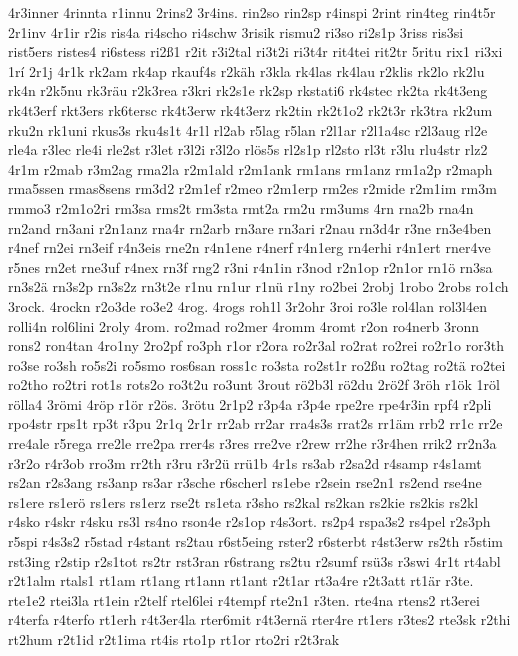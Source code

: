 {4r3inner
4rinnta
r1innu
2rins2
3r4ins.
rin2so
rin2sp
r4inspi
2rint
rin4teg
rin4t5r
2r1inv
4r1ir
r2is
ris4a
ri4scho
ri4schw
3risik
rismu2
ri3so
ri2s1p
3riss
ris3si
rist5ers
ristes4
ri6stess
ri2ß1
r2it
r3i2tal
ri3t2i
ri3t4r
rit4tei
rit2tr
5ritu
rix1
ri3xi
1rí
2r1j
4r1k
rk2am
rk4ap
rkauf4s
r2käh
r3kla
rk4las
rk4lau
r2klis
rk2lo
rk2lu
rk4n
r2k5nu
rk3räu
r2k3rea
r3kri
rk2s1e
rk2sp
rkstati6
rk4stec
rk2ta
rk4t3eng
rk4t3erf
rkt3ers
rk6tersc
rk4t3erw
rk4t3erz
rk2tin
rk2t1o2
rk2t3r
rk3tra
rk2um
rku2n
rk1uni
rkus3s
rku4s1t
4r1l
rl2ab
r5lag
r5lan
r2l1ar
r2l1a4sc
r2l3aug
rl2e
rle4a
r3lec
rle4i
rle2st
r3let
r3l2i
r3l2o
rlös5s
rl2s1p
rl2sto
rl3t
r3lu
rlu4str
rlz2
4r1m
r2mab
r3m2ag
rma2la
r2m1ald
r2m1ank
rm1ans
rm1anz
rm1a2p
r2maph
rma5ssen
rmas8sens
rm3d2
r2m1ef
r2meo
r2m1erp
rm2es
r2mide
r2m1im
rm3m
rmmo3
r2m1o2ri
rm3sa
rms2t
rm3sta
rmt2a
rm2u
rm3ums
4rn
rna2b
rna4n
rn2and
rn3ani
r2n1anz
rna4r
rn2arb
rn3are
rn3ari
r2nau
rn3d4r
r3ne
rn3e4ben
r4nef
rn2ei
rn3eif
r4n3eis
rne2n
r4n1ene
r4nerf
r4n1erg
rn4erhi
r4n1ert
rner4ve
r5nes
rn2et
rne3uf
r4nex
rn3f
rng2
r3ni
r4n1in
r3nod
r2n1op
r2n1or
rn1ö
rn3sa
rn3s2ä
rn3s2p
rn3s2z
rn3t2e
r1nu
rn1ur
r1nü
r1ny
ro2bei
2robj
1robo
2robs
ro1ch
3rock.
4rockn
r2o3de
ro3e2
4rog.
4rogs
roh1l
3r2ohr
3roi
ro3le
rol4lan
rol3l4en
rolli4n
rol6lini
2roly
4rom.
ro2mad
ro2mer
4romm
4romt
r2on
ro4nerb
3ronn
rons2
ron4tan
4ro1ny
2ro2pf
ro3ph
r1or
r2ora
ro2r3al
ro2rat
ro2rei
ro2r1o
ror3th
ro3se
ro3sh
ro5s2i
ro5smo
ros6san
ross1c
ro3sta
ro2st1r
ro2ßu
ro2tag
ro2tä
ro2tei
ro2tho
ro2tri
rot1s
rots2o
ro3t2u
ro3unt
3rout
rö2b3l
rö2du
2rö2f
3röh
r1ök
1röl
rölla4
3römi
4röp
r1ör
r2ös.
3rötu
2r1p2
r3p4a
r3p4e
rpe2re
rpe4r3in
rpf4
r2pli
rpo4str
rps1t
rp3t
r3pu
2r1q
2r1r
rr2ab
rr2ar
rra4s3s
rrat2s
rr1äm
rrb2
rr1c
rr2e
rre4ale
r5rega
rre2le
rre2pa
rrer4s
r3res
rre2ve
r2rew
rr2he
r3r4hen
rrik2
rr2n3a
r3r2o
r4r3ob
rro3m
rr2th
r3ru
r3r2ü
rrü1b
4r1s
rs3ab
r2sa2d
r4samp
r4s1amt
rs2an
r2s3ang
rs3anp
rs3ar
r3sche
r6scherl
rs1ebe
r2sein
rse2n1
rs2end
rse4ne
rs1ere
rs1erö
rs1ers
rs1erz
rse2t
rs1eta
r3sho
rs2kal
rs2kan
rs2kie
rs2kis
rs2kl
r4sko
r4skr
r4sku
rs3l
rs4no
rson4e
r2s1op
r4s3ort.
rs2p4
rspa3s2
rs4pel
r2s3ph
r5spi
r4s3s2
r5stad
r4stant
rs2tau
r6st5eing
rster2
r6sterbt
r4st3erw
rs2th
r5stim
rst3ing
r2stip
r2s1tot
rs2tr
rst3ran
r6strang
rs2tu
r2sumf
rsü3s
r3swi
4r1t
rt4abl
r2t1alm
rtals1
rt1am
rt1ang
rt1ann
rt1ant
r2t1ar
rt3a4re
r2t3att
rt1är
r3te.
rte1e2
rtei3la
rt1ein
r2telf
rtel6lei
r4tempf
rte2n1
r3ten.
rte4na
rtens2
rt3erei
r4terfa
r4terfo
rt1erh
r4t3er4la
rter6mit
r4t3ernä
rter4re
rt1ers
r3tes2
rte3sk
r2thi
rt2hum
r2t1id
r2t1ima
rt4is
rto1p
rt1or
rto2ri
r2t3rak
}
